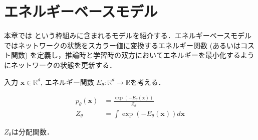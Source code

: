 \section{エネルギーベースモデル}
本章では\textbf{} という枠組みに含まれるモデルを紹介する．エネルギーベースモデルではネットワークの状態をスカラー値に変換するエネルギー関数 (あるいはコスト関数) を定義し，推論時と学習時の双方においてエネルギーを最小化するようにネットワークの状態を更新する．\cite{LeCun2006-dt}

入力 $\mathbf{x}\in \mathbb{R}^d$, エネルギー関数 $E_\theta: \mathbb{R}^d\to \mathbb{R}$を考える．


\begin{align}
p_\theta(\mathbf{x})&=\frac{\exp(-E_\theta(\mathbf{x}))}{Z_\theta}\\
Z_\theta &= \int \exp(-E_\theta(\mathbf{x})) d\mathbf{x}
\end{align}


$Z_\theta$は分配関数．
